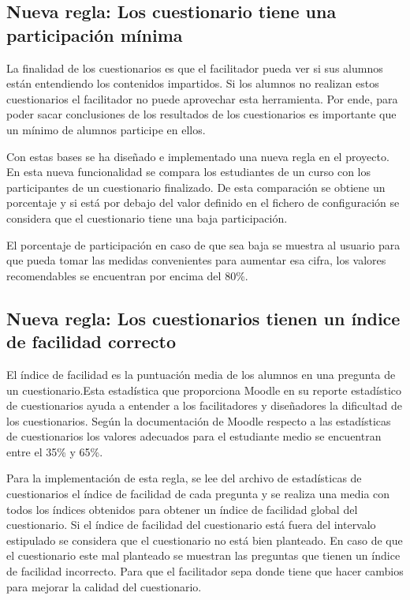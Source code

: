 \subsection{Nueva regla: Los cuestionario tiene una participación mínima}
La finalidad de los cuestionarios es que el facilitador pueda ver si sus alumnos están entendiendo los contenidos impartidos. Si los alumnos no realizan estos cuestionarios el facilitador no puede aprovechar esta herramienta. Por ende, para poder sacar conclusiones de los resultados de los cuestionarios es importante que un mínimo de alumnos participe en ellos. 

Con estas bases se ha diseñado e implementado una nueva regla en el proyecto. En esta nueva funcionalidad se compara los estudiantes de un curso con los participantes de un cuestionario finalizado. De esta comparación se obtiene un porcentaje y si está por debajo del valor definido en el fichero de configuración se considera que el cuestionario tiene una baja participación.

El porcentaje de participación en caso de que sea baja se muestra al usuario para que pueda tomar las medidas convenientes para aumentar esa cifra, los valores recomendables se encuentran por encima del 80\%.

\subsection{Nueva regla: Los cuestionarios tienen un índice de facilidad correcto}
El índice de facilidad es la puntuación media de los alumnos en una pregunta de un cuestionario.Esta estadística que proporciona Moodle en su reporte estadístico de cuestionarios ayuda a entender a los facilitadores y diseñadores la dificultad de los cuestionarios. Según la documentación de Moodle respecto a las estadísticas de cuestionarios \cite{estadisticas-examen} los valores adecuados para el estudiante medio se encuentran entre el 35\% y 65\%.

Para la implementación de esta regla, se lee del archivo de estadísticas de cuestionarios el índice de facilidad de cada pregunta y se realiza una media con todos los índices obtenidos para obtener un índice de facilidad global del cuestionario. Si el índice de facilidad del cuestionario está fuera del intervalo estipulado se considera que el cuestionario no está bien planteado. En caso de que el cuestionario este mal planteado se muestran las preguntas que tienen un índice de facilidad incorrecto. Para que el facilitador sepa donde tiene que hacer cambios para mejorar la calidad del cuestionario.

